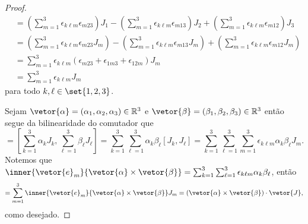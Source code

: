 \begin{proof}
\begin{align*}
        [J_k, J_\ell] &= \left(\sum_{m = 1}^3 \epsilon_{k \ell m} \epsilon_{m23} \right)J_1 - \left(\sum_{m = 1}^3 \epsilon_{k \ell m} \epsilon_{m13} \right)J_2 + \left(\sum_{m = 1}^3 \epsilon_{k \ell m} \epsilon_{m12} \right)J_3 \\
                      &= \left(\sum_{m = 1}^3 \epsilon_{k \ell m} \epsilon_{m23} J_m\right) - \left(\sum_{m = 1}^3 \epsilon_{k \ell m} \epsilon_{m13} J_m\right) + \left(\sum_{m = 1}^3 \epsilon_{k \ell m} \epsilon_{m12} J_m\right)\\
                      &= \sum_{m = 1}^3 \epsilon_{k\ell m} \left( \epsilon_{m23}+\epsilon_{1m3}+\epsilon_{12m}\right)J_m\\
                      &= \sum_{m=1}^3 \epsilon_{k\ell m} J_m
    \end{align*}
    para todo \(k, \ell \in \set{1,2,3}\).

    Sejam \(\vetor{\alpha} = (\alpha_1, \alpha_2, \alpha_3) \in \mathbb{R}^3\) e \(\vetor{\beta} = (\beta_1, \beta_2, \beta_3) \in \mathbb{R}^3\) então segue da bilinearidade do comutador que
    \begin{equation*}
        [\vetor{\alpha} \cdot \vetor{J}, \vetor{\beta}\cdot\vetor{J}] = \left[\sum_{k = 1}^3 \alpha_k J_k,\sum_{\ell = 1}^3 \beta_\ell J_\ell\right] = \sum_{k = 1}^3 \sum_{\ell = 1}^3 \alpha_k \beta_\ell [J_k, J_\ell] = \sum_{k = 1}^3 \sum_{\ell = 1}^3 \sum_{m = 1}^3 \epsilon_{k \ell m} \alpha_k \beta_\ell J_m.
    \end{equation*}
    Notemos que \(\inner{\vetor{e}_m}{\vetor{\alpha}\times \vetor{\beta}} = \sum_{k = 1}^3 \sum_{\ell = 1}^3\epsilon_{k\ell m} \alpha_k \beta_\ell\), então
    \begin{equation*}
        [\vetor{\alpha} \cdot \vetor{J}, \vetor{\beta}\cdot\vetor{J}]  = \sum_{m = 1}^3 \inner{\vetor{e}_m}{\vetor{\alpha}\times \vetor{\beta}}J_m = (\vetor{\alpha}\times \vetor{\beta}) \cdot \vetor{J},
    \end{equation*}
    como desejado.
\end{proof}

